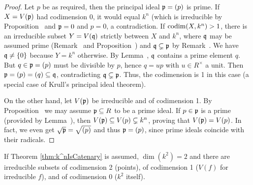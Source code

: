\documentclass[a4paper,parskip=half,numbers=enddot, DIV=12]{scrreprt}
\begin{document}
	\begin{proof}
		Let $p$ be as required, then the principal ideal $\mathfrak{p} = (p)$ is prime. If $X=V(\mathfrak{p})$ had codimension 0, it would equal $k^n$ (which is irreducible by Proposition~ and $\mathfrak{p}=0$ and $p=0$, a contradiction. If $\operatorname{codim}(X,k^n) >1$, there is an irreducible subset $Y=V(\mathfrak{q})$ strictly between $X$ and $k^n$, where $\mathfrak{q}$ may be assumed prime (Remark~ and Proposition~) and $\mathfrak{q}\subsetneq \mathfrak{p}$ by Remark~. We have $\mathfrak{q} \neq \{0\}$ because $Y=k^n$ otherwise. By Lemma~, $\mathfrak{q}$ contains a prime element $q$. But $q\in\mathfrak{p}=(p)$ must be divisible by $p$, hence $q=up$ with $u\in R^\times$ a unit. Then $\mathfrak{p}=(p)=(q)\subseteq\mathfrak{q}$, contradicting $\mathfrak{q}\subsetneq\mathfrak{p}$. Thus, the codimension is 1 in this case (a special case of Krull's principal ideal theorem). 
		
		On the other hand, let $V(\mathfrak{p})$ be irreducible and of codimension 1. By Proposition~ we may assume $\mathfrak{p}\subseteq R$ to be a prime ideal. If $p\in\mathfrak{p}$ is a prime (provided by Lemma~), then $V(\mathfrak{p})\subseteq V(p)\subsetneq k^n$, proving that $V(\mathfrak{p})=V(p)$. In fact, we even get $\sqrt{\mathfrak{p}}=\sqrt{(p)}$ and thus $\mathfrak{p}=(p)$, since prime ideals coincide with their radicals.
	\end{proof}
	
	\begin{rem} 
		If Theorem \ref{thm:k^nIsCatenary} is assumed, $\dim(k^2) = 2$ and there are irreducible subsets of codimension 2 (points), of codimension 1 ($V(f)$ for irreducible $f$), and of codimension 0 ($k^2$ itself).
	\end{rem}
	
\end{document}
